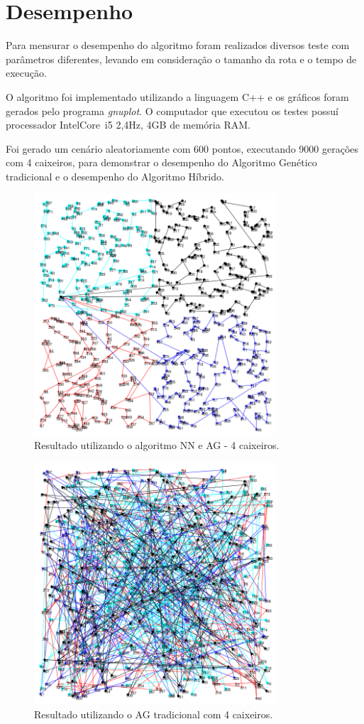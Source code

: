 \documentclass{abnt}
\begin{document}
		\section{Desempenho}
		
		Para mensurar o desempenho do algoritmo foram realizados diversos teste com parâmetros diferentes, levando em consideração o tamanho da rota e o tempo de execução.
		
		O algoritmo foi implementado utilizando a linguagem C++ e os gráficos foram gerados pelo programa \textit{gnuplot}.
		O computador que executou os testes possuí processador Intel\textregistered Core\texttrademark ~i5 2,4Hz, 4GB de memória RAM.
		
		Foi gerado um cenário aleatoriamente com 600 pontos, executando 9000 gerações com 4 caixeiros,  para demonstrar o desempenho do Algoritmo Genético tradicional e o desempenho do Algoritmo Híbrido.
		

		\begin{figure}[h]
				\centering
		        \includegraphics[width = 9cm,keepaspectratio]{img/ga-nn.png}
		        \caption{Resultado utilizando o algoritmo NN e AG - 4 caixeiros.}
		        \label{ga-nn}
	   		\end{figure}
		
		\begin{figure}[h]
				\centering
		        \includegraphics[width = 9cm,keepaspectratio]{img/ga-ale.png}
		        \caption{Resultado utilizando o AG tradicional com 4 caixeiros.}
		        \label{ga-ale}
	   	\end{figure}
	
\end{document}
